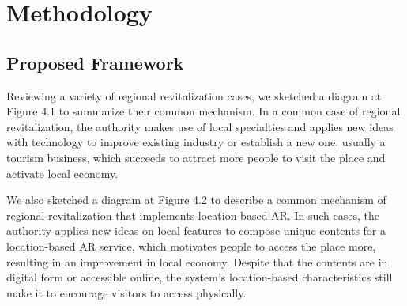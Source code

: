 \chapter{Methodology}\label{ch:4}

\section{Proposed Framework}
Reviewing a variety of regional revitalization cases, we sketched a diagram at Figure 4.1 to summarize their common mechanism.
In a common case of regional revitalization, the authority makes use of local specialties and applies new ideas with technology to improve existing industry or establish a new one,
usually a tourism business, which succeeds to attract more people to visit the place and activate local economy.

We also sketched a diagram at Figure 4.2 to describe a common mechanism of regional revitalization that implements location-based AR.
In such cases, the authority applies new ideas on local features to compose unique contents for a location-based AR service,
which motivates people to access the place more, resulting in an improvement in local economy.
Despite that the contents are in digital form or accessible online, the system's location-based characteristics still make it to encourage visitors to access physically.

